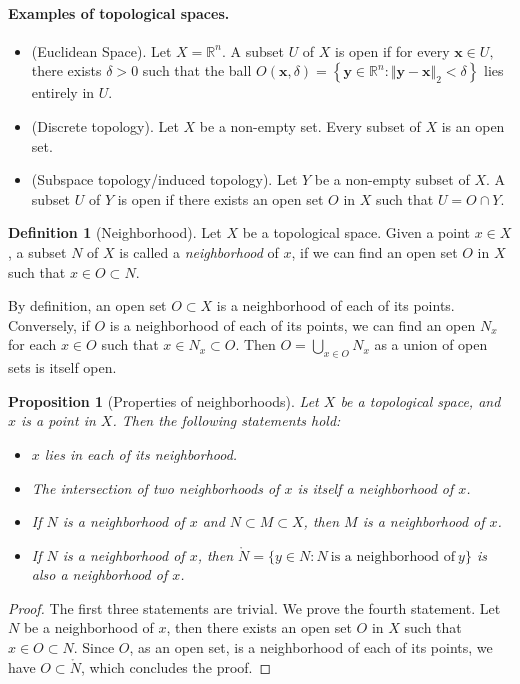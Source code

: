 \documentclass{article}
\numberwithin{equation}{section}
\theoremstyle{plain}
\newtheorem{proposition}[theorem]{Proposition}
\theoremstyle{definition}
\newtheorem{definition}[theorem]{Definition}
\begin{document}
\paragraph{Examples of topological spaces.}
\begin{itemize}
	\item (Euclidean Space). Let $X = \mathbb{R}^n.$ A subset $U$ of $X$ is open if for every $\mathbf{x}\in U,$ there exists $\delta > 0$ such that the ball $O(\mathbf{x},\delta) = \left\{\mathbf{y}\in\mathbb{R}^n:\Vert\mathbf{y}-\mathbf{x}\Vert_2 < \delta\right\}$ lies entirely in $U$.
	\item (Discrete topology). Let $X$ be a non-empty set. Every subset of $X$ is an open set.
	\item (Subspace topology/induced topology). Let $Y$ be a non-empty subset of $X$. A subset $U$ of $Y$ is open if there exists an open set $O$ in $X$ such that $U=O\cap Y$.
\end{itemize}

\begin{definition}[Neighborhood]\label{def:1.2}
Let $X$ be a topological space. Given a point $x\in X$, a subset $N$ of $X$ is called a \textit{neighborhood} of $x$, if we can find an open set $O$ in $X$ such that $x\in O \subset N$.
\end{definition} 
By definition, an open set $O\subset X$ is a neighborhood of each of its points. Conversely, if $O$ is a neighborhood of each of its points, we can find an open $N_x$ for each $x\in O$ such that $x\in N_x\subset O$. Then $O=\bigcup_{x\in O}N_x$ as a union of open sets is itself open.

\begin{proposition}[Properties of neighborhoods]\label{prop:1.3}
 Let $X$ be a topological space, and $x$ is a point in $X$. Then the following statements hold:
\begin{itemize}
	\item[(i)] $x$ lies in each of its neighborhood.
	\item[(ii)] The intersection of two neighborhoods of $x$ is itself a neighborhood of $x$.
	\item[(iii)] If $N$ is a neighborhood of $x$ and $N\subset M \subset X$, then $M$ is a neighborhood of $x$.
	\item[(iv)] If $N$ is a neighborhood of $x$, then $\mathring{N}=\{y\in N:N \ \text{is a neighborhood of}\ y\}$ is also a neighborhood of $x$.
\end{itemize}
\end{proposition}
\begin{proof}
The first three statements are trivial. We prove the fourth statement. Let $N$ be a neighborhood of $x$, then there exists an open set $O$ in $X$ such that $x\in O \subset N$. Since $O$, as an open set, is a neighborhood of each of its points, we have $O\subset\mathring{N}$, which concludes the proof.
\end{proof}
\end{document}
